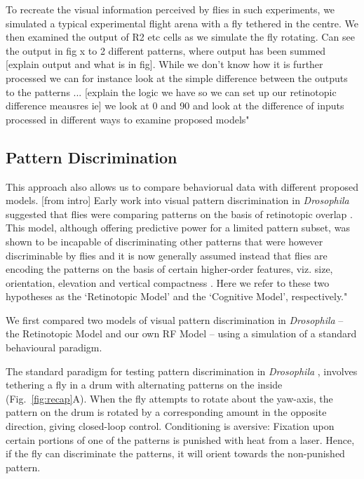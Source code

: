 To recreate the visual information perceived by flies in such experiments, we simulated a typical experimental flight arena with a fly tethered in the centre. We then examined the output of R2 etc 
cells as we simulate the fly rotating. Can see the output in fig x to 2 different patterns, where output has been summed [explain output and what is in fig]. 
While we don't know  how it is further processed we can for instance look at the simple difference between the outputs to the patterns ... [explain the logic we have so we can set up our retinotopic
difference meausres ie] we look at 0 and 90 and look at the difference of inputs processed in different ways to examine proposed models"

\subsection{Pattern Discrimination}
\label{sec:results:pattern}


This approach also allows us to compare behaviorual data 
with different proposed models.  [from intro] Early work into visual pattern discrimination in \emph{Drosophila} suggested that flies were comparing patterns on the basis of retinotopic overlap \cite{Dill1995,Dill1993}.
This model, although offering predictive power for a limited pattern subset, was shown to be incapable of discriminating other patterns that were however discriminable by flies \cite{Ernst1999} and it is now generally assumed instead that flies are encoding the patterns on the basis of certain higher-order features, viz. size, orientation, elevation and vertical compactness \cite{Ernst1999,Liu2006,Pan2009}.
Here we refer to these two hypotheses as the `Retinotopic Model' and the `Cognitive Model', respectively."


We first compared two models of visual pattern discrimination in \emph{Drosophila} -- the Retinotopic Model \cite{Dill1995,Dill1993} and our own RF Model -- using a simulation of a standard behavioural paradigm.

The standard paradigm for testing pattern discrimination in \emph{Drosophila} \cite{Pan2009,Liu2006,Ernst1999,Dill1993}, involves tethering a fly in a drum with alternating patterns on the inside (Fig.~\ref{fig:recap}A).
When the fly attempts to rotate about the yaw-axis, the pattern on the drum is rotated by a corresponding amount in the opposite direction, giving closed-loop control.
Conditioning is aversive: Fixation upon certain portions of one of the patterns is punished with heat from a laser.
Hence, if the fly can discriminate the patterns, it will orient towards the non-punished pattern.

